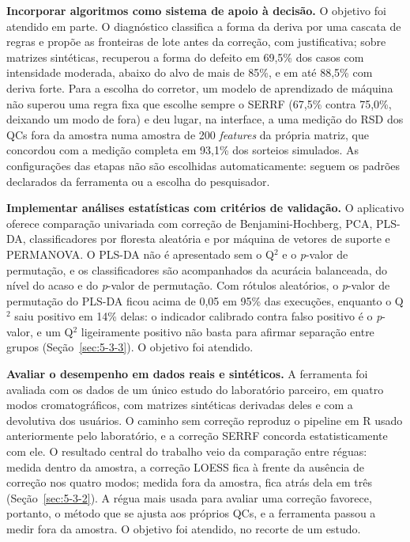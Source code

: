 \textbf{Incorporar algoritmos como sistema de apoio à decisão.} O objetivo foi atendido em parte. O diagnóstico classifica a forma da deriva por uma cascata de regras e propõe as fronteiras de lote antes da correção, com justificativa; sobre matrizes sintéticas, recuperou a forma do defeito em 69,5\% dos casos com intensidade moderada, abaixo do alvo de mais de 85\%, e em até 88,5\% com deriva forte. Para a escolha do corretor, um modelo de aprendizado de máquina não superou uma regra fixa que escolhe sempre o SERRF (67,5\% contra 75,0\%, deixando um modo de fora) e deu lugar, na interface, a uma medição do RSD dos QCs fora da amostra numa amostra de 200 \textit{features} da própria matriz, que concordou com a medição completa em 93,1\% dos sorteios simulados. As configurações das etapas não são escolhidas automaticamente: seguem os padrões declarados da ferramenta ou a escolha do pesquisador.

\textbf{Implementar análises estatísticas com critérios de validação.} O aplicativo oferece comparação univariada com correção de Benjamini-Hochberg, PCA, PLS-DA, classificadores por floresta aleatória e por máquina de vetores de suporte e PERMANOVA. O PLS-DA não é apresentado sem o Q$^{2}$ e o \textit{p}-valor de permutação, e os classificadores são acompanhados da acurácia balanceada, do nível do acaso e do \textit{p}-valor de permutação. Com rótulos aleatórios, o \textit{p}-valor de permutação do PLS-DA ficou acima de 0,05 em 95\% das execuções, enquanto o Q$^{2}$ saiu positivo em 14\% delas: o indicador calibrado contra falso positivo é o \textit{p}-valor, e um Q$^{2}$ ligeiramente positivo não basta para afirmar separação entre grupos (Seção~\ref{sec:5-3-3}). O objetivo foi atendido.

\textbf{Avaliar o desempenho em dados reais e sintéticos.} A ferramenta foi avaliada com os dados de um único estudo do laboratório parceiro, em quatro modos cromatográficos, com matrizes sintéticas derivadas deles e com a devolutiva dos usuários. O caminho sem correção reproduz o pipeline em R usado anteriormente pelo laboratório, e a correção SERRF concorda estatisticamente com ele. O resultado central do trabalho veio da comparação entre réguas: medida dentro da amostra, a correção LOESS fica à frente da ausência de correção nos quatro modos; medida fora da amostra, fica atrás dela em três (Seção~\ref{sec:5-3-2}). A régua mais usada para avaliar uma correção favorece, portanto, o método que se ajusta aos próprios QCs, e a ferramenta passou a medir fora da amostra. O objetivo foi atendido, no recorte de um estudo.

